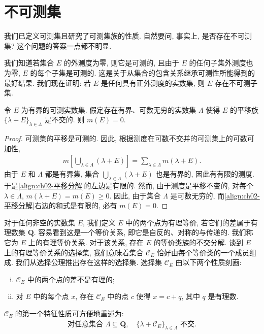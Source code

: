 \documentclass[../../main.tex]{subfiles}
\begin{document}
\section{不可测集}\label{section:ch02-不可测集}

我们已定义可测集且研究了可测集族的性质. 自然要问, 事实上, 是否存在不可测集? 这个问题的答案一点都不明显.

我们知道若集合 $E$ 的外测度为零, 则它是可测的, 且由于 $E$ 的任何子集外测度也为零, $E$ 的每个子集是可测的. 这是关于从集合的包含关系继承可测性所能得到的最好结果. 我们现在证明: 若 $E$ 是任何具有正外测度的实数集, 则 $E$ 存在不可测子集.

\begin{lemma}\label{lemma:ch02-平移零测}
令 $E$ 为有界的可测实数集. 假定存在有界、可数无穷的实数集 $\Lambda$ 使得 $E$ 的平移族 $\{\lambda+E\}_{\lambda\in\Lambda}$ 是不交的. 则 $m(E)=0$.
\end{lemma}

\begin{proof}
可测集的平移是可测的. 因此, 根据测度在可数不交并的可测集上的可数可加性,
\begin{align}
m\left[\bigcup_{\lambda\in\Lambda}(\lambda+E)\right]=\sum_{\lambda\in\Lambda}m(\lambda+E).\label{align:ch02-平移分解}
\end{align}
由于 $E$ 和 $\Lambda$ 都是有界集, 集合 $\bigcup_{\lambda\in\Lambda}(\lambda+E)$ 也是有界的, 因此有有限的测度. 于是\eqref{align:ch02-平移分解}的左边是有限的. 然而, 由于测度是平移不变的, 对每个 $\lambda\in\Lambda$, $m(\lambda+E)=m(E)\geqslant 0$. 因此, 由于集合 $\Lambda$ 是可数无穷的, 而\eqref{align:ch02-平移分解}右边的和式是有限的, 必有 $m(E)=0$.
\end{proof}

对于任何非空的实数集 $E$, 我们定义 $E$ 中的两个点为有理等价, 若它们的差属于有理数集 $\mathbf{Q}$. 容易看到这是一个等价关系, 即它是自反的、对称的与传递的. 我们称它为 $E$ 上的有理等价关系. 对于该关系, 存在 $E$ 的等价类族的不交分解. 谈到 $E$ 上的有理等价关系的选择集, 我们意味着集合 $\mathcal{C}_{E}$ 恰好由每个等价类的一个成员组成. 我们从选择公理推出存在这样的选择集. 选择集 $\mathcal{C}_{E}$ 由以下两个性质刻画:
\begin{enumerate}[(i)]
\item $\mathcal{C}_{E}$ 中的两个点的差不是有理的;
\item 对 $E$ 中的每个点 $x$, 存在 $\mathcal{C}_{E}$ 中的点 $c$ 使得 $x=c+q$, 其中 $q$ 是有理数.
\end{enumerate}

$\mathcal{C}_{E}$ 的第一个特征性质可方便地重述为:
\begin{align}
\text{对任意集合 }\Lambda\subseteq\mathbf{Q},\quad\{\lambda+\mathcal{C}_{E}\}_{\lambda\in\Lambda}\text{ 不交}.\label{align:ch02-选择集不交}
\end{align}
\end{document}

